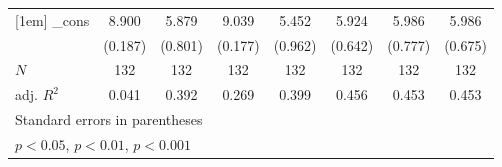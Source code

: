 {\begin{tabular}{l*{7}{c}}
[1em]
\_cons      &       8.900\sym{***}&       5.879\sym{***}&       9.039\sym{***}&       5.452\sym{***}&       5.924\sym{***}&       5.986\sym{***}&       5.986\sym{***}\\
            &     (0.187)         &     (0.801)         &     (0.177)         &     (0.962)         &     (0.642)         &     (0.777)         &     (0.675)         \\
\hline
\(N\)       &         132         &         132         &         132         &         132         &         132         &         132         &         132         \\
adj. \(R^{2}\)&       0.041         &       0.392         &       0.269         &       0.399         &       0.456         &       0.453         &       0.453         \\
\hline\hline
\multicolumn{8}{l}{\footnotesize Standard errors in parentheses}\\
\multicolumn{8}{l}{\footnotesize \sym{*} \(p<0.05\), \sym{**} \(p<0.01\), \sym{***} \(p<0.001\)}\\
\end{tabular}
}

